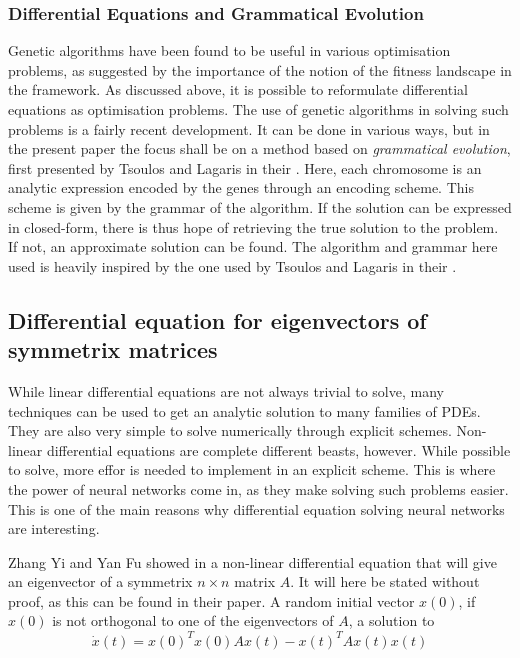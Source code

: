 \documentclass[multicolumn, 10pt]{extarticle}
\begin{document}
\subsubsection{Differential Equations and Grammatical Evolution}
Genetic algorithms have been found to be useful in various optimisation problems, as suggested by the importance of the notion of the fitness landscape in the framework. As discussed above, it is possible to reformulate differential equations as optimisation problems. The use of genetic algorithms in solving such problems is a fairly recent development. It can be done in various ways, but in the present paper the focus shall be on a method based on \textit{grammatical evolution}, first presented by Tsoulos and Lagaris in their \cite{Lagaris}. Here, each chromosome is an analytic expression encoded by the genes through an encoding scheme. This scheme is given by the grammar of the algorithm. If the solution can be expressed in closed-form, there is thus hope of retrieving the true solution to the problem. If not, an approximate solution can be found. The algorithm and grammar here used is heavily inspired by the one used by Tsoulos and Lagaris in their  \cite{Lagaris}.

\subsection{Differential equation for eigenvectors of symmetrix matrices}
While linear differential equations are not always trivial to solve, many techniques can be used to get an analytic solution to many families of PDEs. They are also very simple to solve numerically through explicit schemes. Non-linear differential equations are complete different beasts, however. While possible to solve, more effor is needed to implement in an explicit scheme. This is where the power of neural networks come in, as they make solving such problems easier. This is one of the main reasons why differential equation solving neural networks are interesting.

Zhang Yi and Yan Fu showed in \cite{symmetric} a non-linear differential equation that will give an eigenvector of a symmetrix $n\times n$ matrix $A$. It will here be stated without proof, as this can be found in their paper. A random initial vector $x(0)$, if $x(0)$ is not orthogonal to one of the eigenvectors of $A$, a solution to
\begin{equation}\label{eq:diff_sym}
	\dot{x}(t) = x(0)^Tx(0)Ax(t)-x(t)^TAx(t)x(t)
\end{equation}
\end{document}
